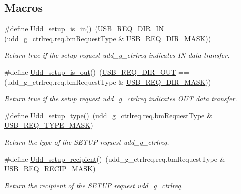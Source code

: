 \subsection*{Macros}
\begin{DoxyCompactItemize}
\item 
\hypertarget{group__udd__group_gaffd9b7cf165cd149868373fa12595d12}{\#define \hyperlink{group__udd__group_gaffd9b7cf165cd149868373fa12595d12}{Udd\-\_\-setup\-\_\-is\-\_\-in}()~(\hyperlink{group__usb__protocol__group_ga3d3c24265f68a720887ae4ff7158d605}{U\-S\-B\-\_\-\-R\-E\-Q\-\_\-\-D\-I\-R\-\_\-\-I\-N} == (udd\-\_\-g\-\_\-ctrlreq.\-req.\-bm\-Request\-Type \& \hyperlink{group__usb__protocol__group_gac94f5ec9106e17f2e6d927eeac3d530f}{U\-S\-B\-\_\-\-R\-E\-Q\-\_\-\-D\-I\-R\-\_\-\-M\-A\-S\-K}))}\label{group__udd__group_gaffd9b7cf165cd149868373fa12595d12}

\begin{DoxyCompactList}\small\item\em Return true if the setup request {\itshape udd\-\_\-g\-\_\-ctrlreq} indicates I\-N data transfer. \end{DoxyCompactList}\item 
\hypertarget{group__udd__group_gaf67b7c8de30fdc881b567385f2345926}{\#define \hyperlink{group__udd__group_gaf67b7c8de30fdc881b567385f2345926}{Udd\-\_\-setup\-\_\-is\-\_\-out}()~(\hyperlink{group__usb__protocol__group_ga3fae7189eea003bf79ac2949b0f50584}{U\-S\-B\-\_\-\-R\-E\-Q\-\_\-\-D\-I\-R\-\_\-\-O\-U\-T} == (udd\-\_\-g\-\_\-ctrlreq.\-req.\-bm\-Request\-Type \& \hyperlink{group__usb__protocol__group_gac94f5ec9106e17f2e6d927eeac3d530f}{U\-S\-B\-\_\-\-R\-E\-Q\-\_\-\-D\-I\-R\-\_\-\-M\-A\-S\-K}))}\label{group__udd__group_gaf67b7c8de30fdc881b567385f2345926}

\begin{DoxyCompactList}\small\item\em Return true if the setup request {\itshape udd\-\_\-g\-\_\-ctrlreq} indicates O\-U\-T data transfer. \end{DoxyCompactList}\item 
\#define \hyperlink{group__udd__group_ga85dc2b7b6c270e8dd8323fa4779a7ca2}{Udd\-\_\-setup\-\_\-type}()~(udd\-\_\-g\-\_\-ctrlreq.\-req.\-bm\-Request\-Type \& \hyperlink{group__usb__protocol__group_ga8be8332e2da1e54c74c5f2a2230b0a28}{U\-S\-B\-\_\-\-R\-E\-Q\-\_\-\-T\-Y\-P\-E\-\_\-\-M\-A\-S\-K})
\begin{DoxyCompactList}\small\item\em Return the type of the S\-E\-T\-U\-P request {\itshape udd\-\_\-g\-\_\-ctrlreq}. \end{DoxyCompactList}\item 
\#define \hyperlink{group__udd__group_gac963bb7b8a965c2fec45a71c9faca6f5}{Udd\-\_\-setup\-\_\-recipient}()~(udd\-\_\-g\-\_\-ctrlreq.\-req.\-bm\-Request\-Type \& \hyperlink{group__usb__protocol__group_gab1738c19d49fe1d4c7edccff90e9e9e4}{U\-S\-B\-\_\-\-R\-E\-Q\-\_\-\-R\-E\-C\-I\-P\-\_\-\-M\-A\-S\-K})
\begin{DoxyCompactList}\small\item\em Return the recipient of the S\-E\-T\-U\-P request {\itshape udd\-\_\-g\-\_\-ctrlreq}. \end{DoxyCompactList}\end{DoxyCompactItemize}
